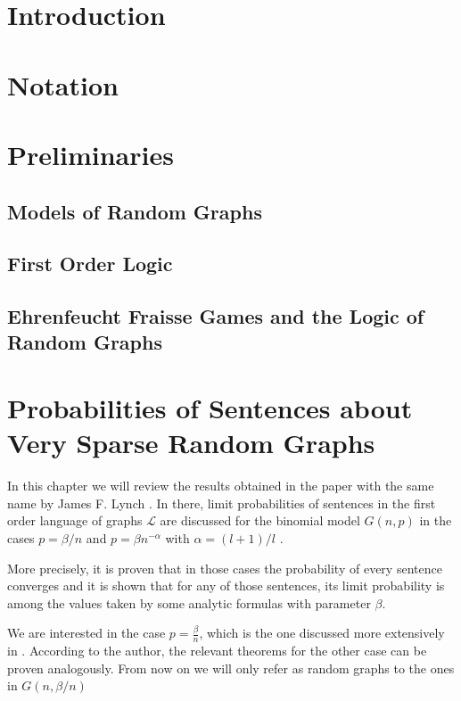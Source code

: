 \documentclass[11pt,notitlepage]{report}
\theoremstyle{definition}
\begin{document}
\tableofcontents

\chapter*{Introduction}

\chapter*{Notation}



\chapter{Preliminaries}


\section{Models of Random Graphs}

\section{First Order Logic}

\section{Ehrenfeucht Fraisse Games and the Logic of Random Graphs}



\chapter{Probabilities of Sentences about Very Sparse Random Graphs}


In this chapter we will review the results obtained
 in the paper with the same name by James F. Lynch \cite{lynch1992probabilities}.
In there, limit probabilities of sentences in the first order language of graphs $\mathcal{L}$
are discussed for the binomial model $G(n,p)$ in the cases $p=\beta/n$ and
$p=\beta n^{-\alpha}$ with $\alpha=(l+1)/l$ . \par

More precisely, it is proven that in those cases the 
probability of every sentence converges and it is shown
that for any of those sentences, its limit probability 
is among the values taken by some analytic formulas
with parameter $\beta$. \par

We are interested in the case $p=\frac{\beta}{n}$, which is 
the one discussed more extensively in \cite{lynch1992probabilities}. 
According to the author, the relevant theorems for 
the other case can be proven analogously. From now on we
will only refer as random graphs to the ones in $G(n,\beta/n)$\par
\end{document}
